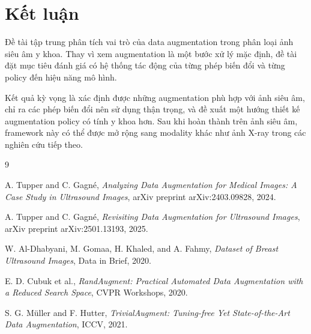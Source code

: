 \documentclass[12pt,a4paper]{article}
\begin{document}
\section{Kết luận}

Đề tài tập trung phân tích vai trò của data augmentation trong phân loại ảnh siêu âm y khoa. Thay vì xem augmentation là một bước xử lý mặc định, đề tài đặt mục tiêu đánh giá có hệ thống tác động của từng phép biến đổi và từng policy đến hiệu năng mô hình.

Kết quả kỳ vọng là xác định được những augmentation phù hợp với ảnh siêu âm, chỉ ra các phép biến đổi nên sử dụng thận trọng, và đề xuất một hướng thiết kế augmentation policy có tính y khoa hơn. Sau khi hoàn thành trên ảnh siêu âm, framework này có thể được mở rộng sang modality khác như ảnh X-ray trong các nghiên cứu tiếp theo.

\begin{thebibliography}{9}

A. Tupper and C. Gagné,
\textit{Analyzing Data Augmentation for Medical Images: A Case Study in Ultrasound Images},
arXiv preprint arXiv:2403.09828, 2024.

A. Tupper and C. Gagné,
\textit{Revisiting Data Augmentation for Ultrasound Images},
arXiv preprint arXiv:2501.13193, 2025.

W. Al-Dhabyani, M. Gomaa, H. Khaled, and A. Fahmy,
\textit{Dataset of Breast Ultrasound Images},
Data in Brief, 2020.

E. D. Cubuk et al.,
\textit{RandAugment: Practical Automated Data Augmentation with a Reduced Search Space},
CVPR Workshops, 2020.

S. G. Müller and F. Hutter,
\textit{TrivialAugment: Tuning-free Yet State-of-the-Art Data Augmentation},
ICCV, 2021.

\end{thebibliography}
\end{document}
